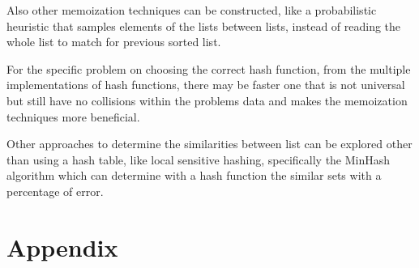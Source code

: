 \documentclass[a4paper,12pt]{article}
\begin{document}
Also other memoization techniques can be constructed, like a probabilistic heuristic that samples elements of the lists between lists, instead of reading the whole list to match for previous sorted list.

For the specific problem on choosing the correct hash function, from the multiple implementations of hash functions, there may be faster one that is not universal but still have no collisions within the problems data and makes the memoization techniques more beneficial.

Other approaches to determine the similarities between list can be explored other than using a hash table, like local sensitive hashing, specifically the MinHash algorithm which can determine with a hash function the similar sets with a percentage of error.





\section{Appendix}
\end{document}
